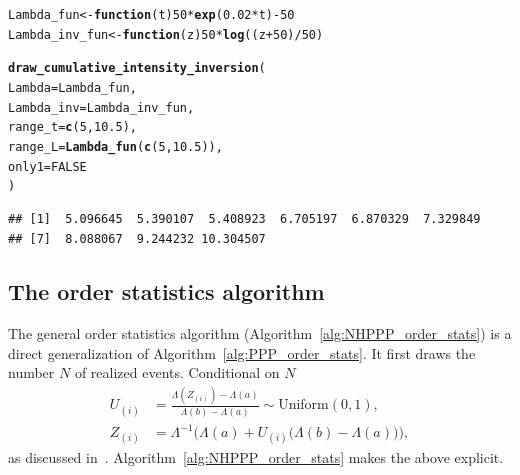 \documentclass[article,nojss]{jss}\usepackage[]{graphicx}\usepackage[]{xcolor}
\makeatletter
\newcommand{\hlnum}[1]{\textcolor[rgb]{0.686,0.059,0.569}{#1}}%
\newcommand{\hlopt}[1]{\textcolor[rgb]{0,0,0}{#1}}%
\newcommand{\hlstd}[1]{\textcolor[rgb]{0.345,0.345,0.345}{#1}}%
\newcommand{\hlkwa}[1]{\textcolor[rgb]{0.161,0.373,0.58}{\textbf{#1}}}%
\newcommand{\hlkwb}[1]{\textcolor[rgb]{0.69,0.353,0.396}{#1}}%
\newcommand{\hlkwc}[1]{\textcolor[rgb]{0.333,0.667,0.333}{#1}}%
\newcommand{\hlkwd}[1]{\textcolor[rgb]{0.737,0.353,0.396}{\textbf{#1}}}%
\newenvironment{kframe}{%
 \def\at@end@of@kframe{}%
 \ifinner\ifhmode%
  \def\at@end@of@kframe{\end{minipage}}%
  \begin{minipage}{\columnwidth}%
 \fi\fi%
 \def\FrameCommand##1{\hskip\@totalleftmargin \hskip-\fboxsep
 \colorbox{shadecolor}{##1}\hskip-\fboxsep
     \hskip-\linewidth \hskip-\@totalleftmargin \hskip\columnwidth}%
 \MakeFramed {\advance\hsize-\width
   \@totalleftmargin\z@ \linewidth\hsize
   \@setminipage}}%
 {\par\unskip\endMakeFramed%
 \at@end@of@kframe}
\newenvironment{knitrout}{}{} %
\makeatother
\begin{document}
\begin{knitrout}
\color{fgcolor}\begin{kframe}
\begin{alltt}
\hlstd{Lambda_fun} \hlkwb{<-} \hlkwa{function}\hlstd{(}\hlkwc{t}\hlstd{)} \hlnum{50} \hlopt{*} \hlkwd{exp}\hlstd{(}\hlnum{0.02} \hlopt{*} \hlstd{t)} \hlopt{-} \hlnum{50}
\hlstd{Lambda_inv_fun} \hlkwb{<-} \hlkwa{function}\hlstd{(}\hlkwc{z}\hlstd{)} \hlnum{50} \hlopt{*} \hlkwd{log}\hlstd{((z} \hlopt{+} \hlnum{50}\hlstd{)} \hlopt{/} \hlnum{50}\hlstd{)}

\hlkwd{draw_cumulative_intensity_inversion}\hlstd{(}
  \hlkwc{Lambda} \hlstd{= Lambda_fun,}
  \hlkwc{Lambda_inv} \hlstd{= Lambda_inv_fun,}
  \hlkwc{range_t} \hlstd{=} \hlkwd{c}\hlstd{(}\hlnum{5}\hlstd{,} \hlnum{10.5}\hlstd{),}
  \hlkwc{range_L} \hlstd{=} \hlkwd{Lambda_fun}\hlstd{(}\hlkwd{c}\hlstd{(}\hlnum{5}\hlstd{,} \hlnum{10.5}\hlstd{)),}
  \hlkwc{only1} \hlstd{=} \hlnum{FALSE}
\hlstd{)}
\end{alltt}
\begin{verbatim}
## [1]  5.096645  5.390107  5.408923  6.705197  6.870329  7.329849
## [7]  8.088067  9.244232 10.304507
\end{verbatim}
\end{kframe}
\end{knitrout}



\subsection{The order statistics algorithm}\label{sec:order-stats}
The general order statistics algorithm (Algorithm~\ref{alg:NHPPP_order_stats}) is a direct generalization of Algorithm~\ref{alg:PPP_order_stats}. It first draws the number $N$ of realized events. Conditional on $N$
\begin{equation}\label{eq:nhppp_orderstats1}
\begin{aligned}
U_{(i)} &= \frac{\Lambda(Z_{(i)}) - \Lambda(a)}{\Lambda(b)- \Lambda(a)} \sim \textrm{Uniform}(0,1), \\
Z_{(i)} &= \Lambda^{-1} \Big ( \Lambda(a) + U_{(i)} \big( \Lambda(b)- \Lambda(a) \big) \Big),
\end{aligned}
\end{equation}
as discussed in~\citet{lewis1979thinning}. Algorithm~\ref{alg:NHPPP_order_stats} makes the above explicit.


\end{document}
